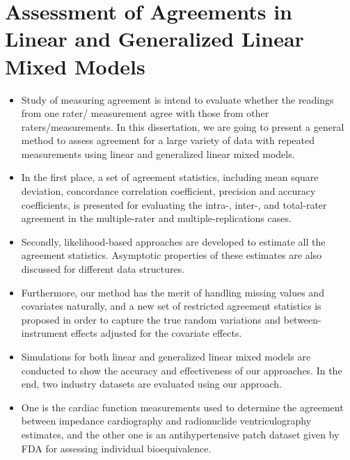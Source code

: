 \section{Assessment of Agreements in Linear and Generalized Linear Mixed Models}

\begin{itemize}
\item Study of measuring agreement is intend to evaluate whether the readings from one rater/ measurement 
agree with those from other raters/measurements. 
In this dissertation, we are going to present a general method to assess agreement for a large 
variety of data with repeated measurements using linear and generalized linear mixed models. 
\item In the first place, a set of agreement statistics, including mean square deviation, concordance 
correlation coefficient, precision and accuracy coefficients, is presented for evaluating the 
intra-, inter-, and total-rater agreement in the multiple-rater and multiple-replications cases. 
\item Secondly, likelihood-based approaches are developed to estimate all the agreement statistics. 
Asymptotic properties of these estimates are also discussed for different data structures. 
\item Furthermore, our method has the merit of handling missing values and covariates naturally, 
and a new set of restricted agreement statistics is proposed in order to capture the true random 
variations and between-instrument effects adjusted for the covariate effects. 

\item Simulations for both linear and generalized linear mixed models are conducted to show the accuracy and effectiveness 
of our approaches. In the end, two industry datasets are evaluated using our approach. 
\item One is the cardiac function measurements used to determine the agreement between impedance cardiography and radionuclide 
ventriculography estimates, and the other one is an antihypertensive patch dataset given by FDA for assessing 
individual bioequivalence.
\end{itemize}
